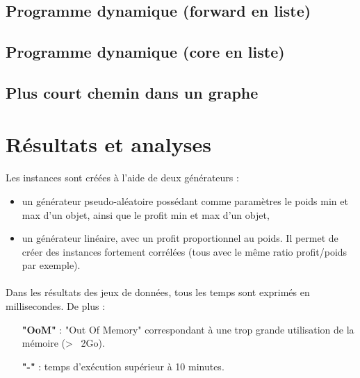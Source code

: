 \documentclass[12pt]{article}
\begin{document}
\subsection{Programme dynamique (forward en liste)}

\paragraph{}

\subsection{Programme dynamique (core en liste)}

\paragraph{}

\subsection{Plus court chemin dans un graphe}

\paragraph{}

\section{Résultats et analyses}

\paragraph{}Les instances sont créées à l'aide de deux générateurs :
\begin{itemize}
\item un générateur pseudo-aléatoire possédant comme paramètres le poids min et max d'un objet, ainsi que le profit min et max d'un objet,
\item un générateur linéaire, avec un profit proportionnel au poids. Il permet de créer des instances fortement corrélées (tous avec le même ratio profit/poids par exemple).
\end{itemize}

\paragraph{}Dans les résultats des jeux de données, tous les temps sont exprimés en millisecondes. De plus :
\begin{itemize}
 \item[\textbf{"OoM"}] : "Out Of Memory" correspondant à une trop grande utilisation de la mémoire (> ~2Go).
 \item[\textbf{"-"}] : temps d'exécution supérieur à 10 minutes.
 \end{itemize}
\end{document}
